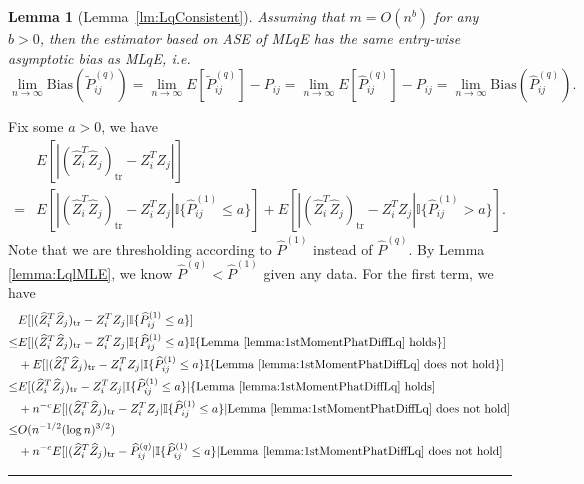 \documentclass[a4paper]{article}
\newenvironment{proof}{{\bf Proof:  }}{\hfill\rule{2mm}{2mm}}
\newtheorem{lemma}[fact]{Lemma}
\renewcommand{\hat}{\widehat}
\begin{document}
\begin{lemma}[Lemma~\ref{lm:LqConsistent}]
\label{lm:LqConsistentproof}
Assuming that $m = O(n^b)$ for any $b > 0$, then the estimator based on ASE of ML$q$E has the same entry-wise asymptotic bias as ML$q$E, i.e.
\[
	\lim_{n \to \infty} \mathrm{Bias}(\widetilde{P}_{ij}^{(q)}) = \lim_{n \to \infty} E[\widetilde{P}_{ij}^{(q)}] - P_{ij} = \lim_{n \to \infty} E[\hat{P}^{(q)}_{ij}] - P_{ij}
    = \lim_{n \to \infty} \mathrm{Bias}(\hat{P}_{ij}^{(q)}).
\]
\end{lemma}
\begin{proof}
Fix some $a > 0$, we have
\begin{align*}
	& E[|(\hat{Z}_i^T \hat{Z}_j)_{\mathrm{tr}} - Z_i^T Z_j|] \\
	= & E[|(\hat{Z}_i^T \hat{Z}_j)_{\mathrm{tr}} - Z_i^T Z_j| \mathbb{I}\{\hat{P}^{(1)}_{ij} \le a\}]
	+ E[|(\hat{Z}_i^T \hat{Z}_j)_{\mathrm{tr}} - Z_i^T Z_j| \mathbb{I}\{\hat{P}^{(1)}_{ij} > a\}].
\end{align*}
Note that we are thresholding according to $\hat{P}^{(1)}$ instead of $\hat{P}^{(q)}$. By Lemma \ref{lemma:LqlMLE}, we know $\hat{P}^{(q)} < \hat{P}^{(1)}$ given any data.
For the first term, we have
\begin{align*}
	& E[|(\hat{Z}_i^T \hat{Z}_j)_{\mathrm{tr}} - Z_i^T Z_j| \mathbb{I}\{\hat{P}^{(1)}_{ij} \le a\}] \\
	\le & E[|(\hat{Z}_i^T \hat{Z}_j)_{\mathrm{tr}} - Z_i^T Z_j| \mathbb{I}\{\hat{P}^{(1)}_{ij} \le a\} \mathbb{I}\{\mathrm{Lemma\ } \ref{lemma:1stMomentPhatDiffLq} \mathrm{\ holds}\}] \\
	& + E[|(\hat{Z}_i^T \hat{Z}_j)_{\mathrm{tr}} - Z_i^T Z_j| \mathbb{I}\{\hat{P}^{(1)}_{ij} \le a\} \mathbb{I}\{\mathrm{Lemma\ } \ref{lemma:1stMomentPhatDiffLq} \mathrm{\ does\ not\ hold}\}] \\
	\le & E[(\hat{Z}_i^T \hat{Z}_j)_{\mathrm{tr}} - Z_i^T Z_j| \mathbb{I}\{\hat{P}^{(1)}_{ij} \le a\} |\{\mathrm{Lemma\ } \ref{lemma:1stMomentPhatDiffLq} \mathrm{\ holds}] \\
	& + n^{-c} E[|(\hat{Z}_i^T \hat{Z}_j)_{\mathrm{tr}} - Z_i^T Z_j| \mathbb{I}\{\hat{P}^{(1)}_{ij} \le a\} | \mathrm{Lemma\ } \ref{lemma:1stMomentPhatDiffLq} \mathrm{\ does\ not\ hold}] \\
	\le & O(n^{-1/2} (\log n)^{3/2}) \\
	& + n^{-c} E[|(\hat{Z}_i^T \hat{Z}_j)_{\mathrm{tr}} - \hat{P}^{(q)}_{ij}| \mathbb{I}\{\hat{P}^{(1)}_{ij} \le a\} | \mathrm{Lemma\ } \ref{lemma:1stMomentPhatDiffLq} \mathrm{\ does\ not\ hold}] \\

\end{align*}
\end{proof}
\end{document}
